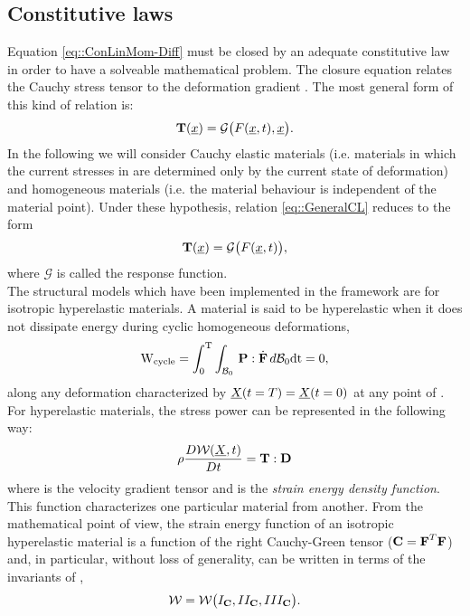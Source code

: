 \subsection{Constitutive laws}
\label{sct-Constitutive} Equation \eqref{eq::ConLinMom-Diff} must be
closed by an adequate constitutive law in order to have a solveable
mathematical problem. The closure equation relates the Cauchy stress
tensor \T to the deformation gradient \F. The most general form of
this kind of relation is:
\begin{equation}
  \textbf{T}(\underline{x})=\mathcal{G}\big(F(\underline{x},t),\underline{x}\big).
  \label{eq::GeneralCL}
\end{equation}
In the following we will consider Cauchy elastic
materials (i.e. materials in which the current stresses in \CurCon are
determined only by the current state of deformation) and homogeneous
materials (i.e. the material behaviour is independent of the material
point). Under these hypothesis, relation \eqref{eq::GeneralCL} reduces
to the form
\begin{equation}
  \textbf{T}(\underline{x})=\mathcal{G}\big(F(\underline{x},t)\big),
  \label{eq::OurRelation}
\end{equation} where $\mathcal{G}$ is called the response function.\\
The structural models which have been implemented in the \SSol
framework are for isotropic hyperelastic materials. A material is said
to be hyperelastic when it does not dissipate energy during cyclic
homogeneous deformations,
\begin{equation}
  \text{W}_{\text{cycle}} =
  \int_{0}^{\text{T}}\int_{\mathcal{B}_0}\,\mathbf{P}:\dot{\mathbf{F}}\,
  d\mathcal{B}_0\text{dt}
  = 0,
  \label{eq::energyDiss}
\end{equation}
along any deformation characterized by
$\underline{X}(t=T)=\underline{X}(t=0)$ at any point of \RefCon. For hyperelastic
materials, the stress power can be represented in the following way:
\begin{equation}
  \rho\frac{D\mathcal{W}(\underline{X},t)}{Dt}=\textbf{T}:\textbf{D}
  \label{eq::HyperSP}
\end{equation}
where \D is the velocity gradient tensor and \W is the
\textit{strain energy density function}. This function characterizes
one particular material from another. From the mathematical point of
view, the strain energy function of an isotropic hyperelastic material
is a function of the right Cauchy-Green tensor ($\textbf{C}=\textbf{F}^{T}\textbf{F}$) and, in
particular, without loss of generality, \W can be written in terms of
the invariants of \C,
\begin{equation}
  \mathcal{W}=\mathcal{W}\big(I_{\textbf{C}},II_{\textbf{C}},III_{\textbf{C}}\big).
  \label{eq::WandInvariants}
\end{equation}
